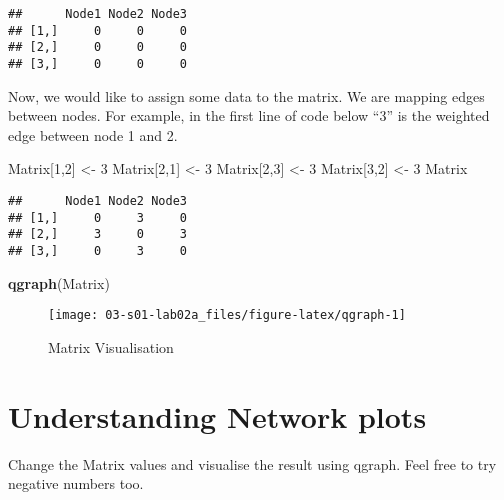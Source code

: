\documentclass[]{book}
\newenvironment{Shaded}{\begin{snugshade}}{\end{snugshade}}
\newcommand{\DecValTok}[1]{\textcolor[rgb]{0.00,0.00,0.81}{#1}}
\newcommand{\KeywordTok}[1]{\textcolor[rgb]{0.13,0.29,0.53}{\textbf{#1}}}
\newcommand{\NormalTok}[1]{#1}
\newcommand{\StringTok}[1]{\textcolor[rgb]{0.31,0.60,0.02}{#1}}
\begin{document}
\begin{verbatim}
##      Node1 Node2 Node3
## [1,]     0     0     0
## [2,]     0     0     0
## [3,]     0     0     0
\end{verbatim}

Now, we would like to assign some data to the matrix. We are mapping edges between nodes. For example, in the first line of code below ``3'' is the weighted edge between node 1 and 2.

\begin{Shaded}
\begin{Highlighting}[]
\NormalTok{Matrix[}\DecValTok{1}\NormalTok{,}\DecValTok{2}\NormalTok{] <-}\StringTok{ }\DecValTok{3}
\NormalTok{Matrix[}\DecValTok{2}\NormalTok{,}\DecValTok{1}\NormalTok{] <-}\StringTok{ }\DecValTok{3}
\NormalTok{Matrix[}\DecValTok{2}\NormalTok{,}\DecValTok{3}\NormalTok{] <-}\StringTok{ }\DecValTok{3}
\NormalTok{Matrix[}\DecValTok{3}\NormalTok{,}\DecValTok{2}\NormalTok{] <-}\StringTok{ }\DecValTok{3}
\NormalTok{Matrix}
\end{Highlighting}
\end{Shaded}

\begin{verbatim}
##      Node1 Node2 Node3
## [1,]     0     3     0
## [2,]     3     0     3
## [3,]     0     3     0
\end{verbatim}

\begin{Shaded}
\begin{Highlighting}[]
\KeywordTok{qgraph}\NormalTok{(Matrix)}
\end{Highlighting}
\end{Shaded}

\begin{figure}

{\centering \texttt{[image: 03-s01-lab02a\_files/figure-latex/qgraph-1]} 

}

\caption{Matrix Visualisation}\label{fig:qgraph}
\end{figure}

\hypertarget{understanding-network-plots}{%
\section{Understanding Network plots}\label{understanding-network-plots}}

Change the Matrix values and visualise the result using qgraph. Feel free to try negative numbers too.
\end{document}
